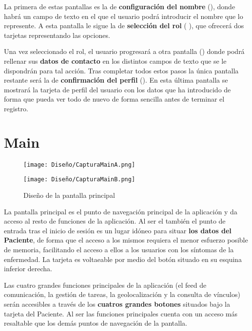 La primera de estas pantallas es la de \textbf{configuración del nombre} (), donde habrá un campo de texto en el que el usuario podrá introducir el nombre que lo represente. A esta pantalla le sigue la de \textbf{selección del rol} ( ), que ofrecerá dos tarjetas representando las opciones.

Una vez seleccionado el rol, el usuario progresará a otra pantalla () donde podrá rellenar sus \textbf{datos de contacto} en los distintos campos de texto que se le dispondrán para tal acción. Tras completar todos estos pasos la única pantalla restante será la de \textbf{confirmación del perfil} (). En esta última pantalla se mostrará la tarjeta de perfil del usuario con los datos que ha introducido de forma que pueda ver todo de nuevo de forma sencilla antes de terminar el registro.

\section{Main}

\begin{figure}[H]
    \centering
    \begin{minipage}{0.5\textwidth}
        \centering
        \texttt{[image: Diseño/CapturaMainA.png]}
        \label{scr:main}
    \end{minipage}\hfill
    \begin{minipage}{0.5\textwidth}
        \centering
        \texttt{[image: Diseño/CapturaMainB.png]}
        \label{scr:main_b}
    \end{minipage}\hfill
    \caption{Diseño de la pantalla principal}
\end{figure}

La pantalla principal es el punto de navegación principal de la aplicación y da acceso al resto de funciones de la aplicación. Al ser el también el punto de entrada tras el inicio de sesión es un lugar idóneo para situar \textbf{los datos del Paciente}, de forma que el acceso a los mismos requiera el menor esfuerzo posible de memoria, facilitando el acceso a ellos a los usuarios con los síntomas de la enfermedad. La tarjeta es voltaeable por medio del botón situado en su esquina inferior derecha.

Las cuatro grandes funciones principales de la aplicación (el feed de comunicación, la gestión de tareas, la geolocalización y la consulta de vínculos) serán accesibles a través de los \textbf{cuatros grandes botones} situados bajo la tarjeta del Paciente. Al ser las funciones principales cuenta con un acceso más resaltable que los demás puntos de navegación de la pantalla.


